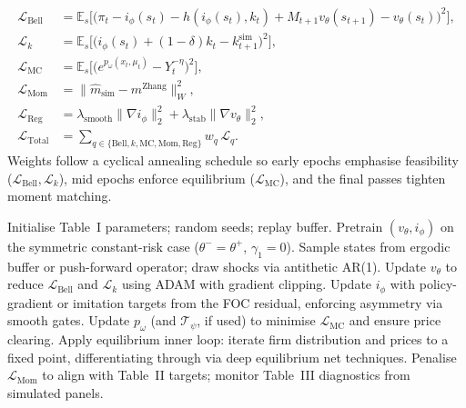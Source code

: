 \documentclass[11pt,a4paper]{article}
\numberwithin{equation}{section}
\begin{document}
\begin{assumptionbox}[title={Loss Components}]
\begin{align*}
  \mathcal L_{\text{Bell}} &= \mathbb E_s\Big[\big(\pi_t - i_\phi(s_t) - h(i_\phi(s_t),k_t) + M_{t+1} v_\theta(s_{t+1}) - v_\theta(s_t)\big)^2\Big],\\
  \mathcal L_{k} &= \mathbb E_s\Big[\big(i_\phi(s_t) + (1-\delta)k_t - k_{t+1}^{\text{sim}}\big)^2\Big],\\
  \mathcal L_{\text{MC}} &= \mathbb E_s\Big[\big(e^{p_\omega(x_t,\mu_t)} - Y_t^{-\eta}\big)^2\Big],\\
  \mathcal L_{\text{Mom}} &= \big\|\widehat{m}_{\text{sim}} - m^{\text{Zhang}}\big\|_{W}^2,\\
  \mathcal L_{\text{Reg}} &= \lambda_{\text{smooth}}\|\nabla i_\phi\|_2^2 + \lambda_{\text{stab}}\|\nabla v_\theta\|_2^2,\\
  \mathcal L_{\text{Total}} &= \sum_{q \in \{\text{Bell},k,\text{MC},\text{Mom},\text{Reg}\}} w_q\,\mathcal L_q.
\end{align*}
Weights follow a cyclical annealing schedule so early epochs emphasise feasibility (\(\mathcal L_{\text{Bell}}, \mathcal L_{k}\)), mid epochs enforce equilibrium (\(\mathcal L_{\text{MC}}\)), and the final passes tighten moment matching.
\end{assumptionbox}

\begin{algobox}[title={Training Loop (Sketch)}]
\begin{algorithmic}[1]
\State Initialise Table~I parameters; random seeds; replay buffer.
\State Pretrain \((v_{\theta}, i_{\phi})\) on the symmetric constant-risk case (\(\theta^-{=}\theta^+\), \(\gamma_1{=}0\)).
\Repeat
  \State Sample states from ergodic buffer or push-forward operator; draw shocks via antithetic AR(1).
  \State Update \(v_{\theta}\) to reduce \(\mathcal L_{\text{Bell}}\) and \(\mathcal L_k\) using ADAM with gradient clipping.
  \State Update \(i_{\phi}\) with policy-gradient or imitation targets from the FOC residual, enforcing asymmetry via smooth gates.
  \State Update \(p_{\omega}\) (and $\mathcal T_{\psi}$, if used) to minimise \(\mathcal L_{\text{MC}}\) and ensure price clearing.
  \State Apply equilibrium inner loop: iterate firm distribution and prices to a fixed point, differentiating through via deep equilibrium net techniques.
  \State Penalise \(\mathcal L_{\text{Mom}}\) to align with Table~II targets; monitor Table~III diagnostics from simulated panels.
\end{algorithmic}
\end{algobox}
\end{document}
